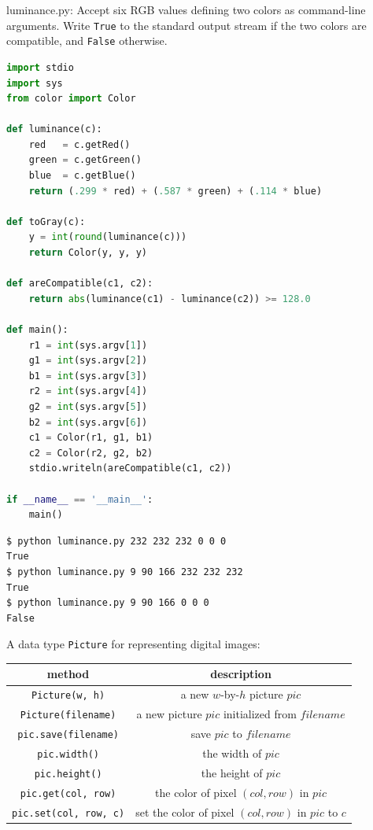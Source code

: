 \documentclass[8pt,a4paper,compress,handout]{beamer}
\begin{document}
\begin{frame}[fragile]
\begin{framed}
\tiny luminance.py: Accept six RGB values defining two colors as command-line arguments. Write \lstinline{True} to the standard output stream if the two colors are compatible, and \lstinline{False} otherwise.
\end{framed}

\begin{lstlisting}[language=Python]
import stdio
import sys
from color import Color

def luminance(c):
    red   = c.getRed()
    green = c.getGreen()
    blue  = c.getBlue()
    return (.299 * red) + (.587 * green) + (.114 * blue)

def toGray(c):
    y = int(round(luminance(c)))
    return Color(y, y, y)

def areCompatible(c1, c2):
    return abs(luminance(c1) - luminance(c2)) >= 128.0

def main():
    r1 = int(sys.argv[1])
    g1 = int(sys.argv[2])
    b1 = int(sys.argv[3])
    r2 = int(sys.argv[4])
    g2 = int(sys.argv[5])
    b2 = int(sys.argv[6])
    c1 = Color(r1, g1, b1)
    c2 = Color(r2, g2, b2)
    stdio.writeln(areCompatible(c1, c2))

if __name__ == '__main__':
    main()
\end{lstlisting}
\end{frame}

\begin{frame}[fragile]
\begin{lstlisting}[language={}]
$ python luminance.py 232 232 232 0 0 0
True
$ python luminance.py 9 90 166 232 232 232
True
$ python luminance.py 9 90 166 0 0 0
False
\end{lstlisting}
\end{frame}

\begin{frame}[fragile]
A data type \lstinline{Picture} for representing digital images:
\begin{center}
\begin{tabular}{cc}
method & description \\ \hline
\lstinline$Picture(w, h)$ & a new $w$-by-$h$ picture $pic$ \\
\lstinline$Picture(filename)$ & a new picture $pic$ initialized from $filename$ \\
\lstinline$pic.save(filename)$ & save $pic$ to $filename$ \\
\lstinline$pic.width()$ & the width of $pic$ \\
\lstinline$pic.height()$ & the height of $pic$ \\
\lstinline$pic.get(col, row)$ & the color of pixel $(col, row)$ in $pic$ \\
\lstinline$pic.set(col, row, c)$ & set the color of pixel $(col, row)$ in $pic$ to $c$
\end{tabular} 
\end{center}
\end{frame}
\end{document}

